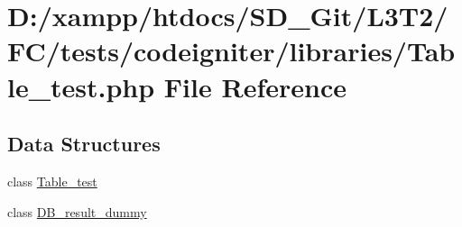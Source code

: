 \hypertarget{_table__test_8php}{}\section{D\+:/xampp/htdocs/\+S\+D\+\_\+\+Git/\+L3\+T2/\+F\+C/tests/codeigniter/libraries/\+Table\+\_\+test.php File Reference}
\label{_table__test_8php}
\subsection*{Data Structures}
\begin{DoxyCompactItemize}
\item 
class \hyperlink{class_table__test}{Table\+\_\+test}
\item 
class \hyperlink{class_d_b__result__dummy}{D\+B\+\_\+result\+\_\+dummy}
\end{DoxyCompactItemize}
